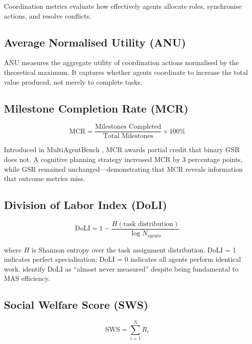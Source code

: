 \documentclass[11pt,a4paper]{article}
\begin{document}
Coordination metrics evaluate how effectively agents allocate roles, synchronise
actions, and resolve conflicts.

\subsection{Average Normalised Utility (ANU)}

ANU \citep[COLLAB;][]{marble2025} measures the aggregate utility of coordination
actions normalised by the theoretical maximum. It captures whether agents coordinate
to increase the total value produced, not merely to complete tasks.

\subsection{Milestone Completion Rate (MCR)}

\begin{equation}
  \text{MCR} = \frac{\text{Milestones Completed}}{\text{Total Milestones}} \times 100\%
\end{equation}

Introduced in MultiAgentBench \citep{marble2025}, MCR awards partial credit that binary
GSR does not. A cognitive planning strategy increased MCR by 3 percentage points, while
GSR remained unchanged—demonstrating that MCR reveals information that outcome metrics
miss.

\subsection{Division of Labor Index (DoLI)}

\begin{equation}
  \text{DoLI} = 1 - \frac{H(\text{task distribution})}{\log N_{\text{agents}}}
\end{equation}

where $H$ is Shannon entropy over the task assignment distribution. DoLI = 1 indicates
perfect specialisation; DoLI = 0 indicates all agents perform identical work.
\citet{llm_eval_survey2025} identify DoLI as ``almost never measured'' despite being
fundamental to MAS efficiency.

\subsection{Social Welfare Score (SWS)}

\begin{equation}
  \text{SWS} = \sum_{i=1}^{N} R_i
\end{equation}
\end{document}
